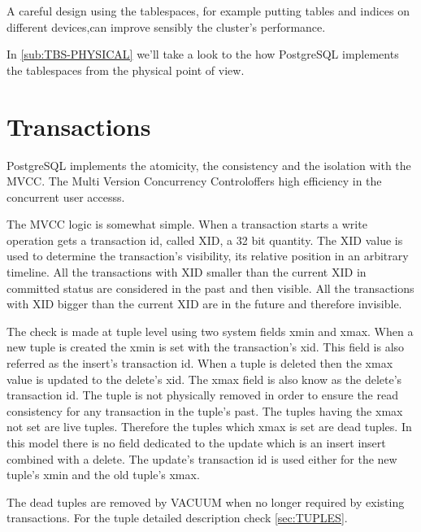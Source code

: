 A careful design using the tablespaces, for example putting tables and indices on different
devices,can improve sensibly the cluster's performance.\newline

In \ref{sub:TBS-PHYSICAL} we'll take a look to the how PostgreSQL implements the tablespaces from the
physical point of view.


\section{Transactions}
\label{sec:TRANSACTION}
PostgreSQL implements the atomicity, the consistency and the isolation with the MVCC.
The Multi Version Concurrency Controloffers high efficiency in
the concurrent user accesss.\newline 

The MVCC logic is somewhat simple. When a transaction starts a write operation gets a transaction id,
called XID, a 32 bit quantity. The XID value is used to determine the transaction's
visibility, its relative position in an arbitrary timeline. All the transactions with XID smaller than
the current XID in committed status are considered in the past and then visible. All the transactions
with XID bigger than the current XID are in the future and therefore invisible.\newline

The check is made at tuple level using two system fields xmin and xmax. When a new tuple is created the
xmin is set with the transaction's xid. This field is also referred as the insert's transaction id. When
a tuple is deleted then the xmax value is updated to the delete's xid. The xmax field is also know as
the delete's  transaction id. The tuple is not physically removed in order to ensure the read consistency
for any transaction in the tuple's past. The tuples having the xmax not set are live tuples. Therefore
the tuples which xmax is set are dead tuples. In this model there is no field dedicated to the
update which is an insert insert combined with a delete. The update's transaction id is used either for
the new tuple's xmin and the old tuple's xmax.\newline

The dead tuples are removed by VACUUM when no longer required by existing transactions.
For the tuple detailed description check \ref{sec:TUPLES}.\newline

